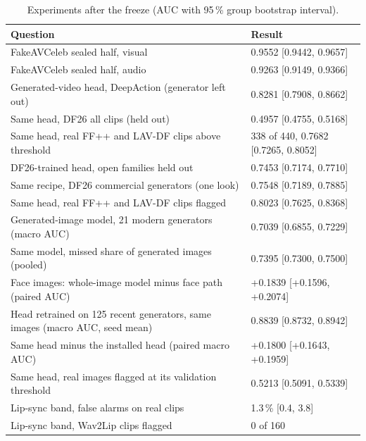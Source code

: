 \documentclass[conference,a4paper]{IEEEtran_nodash}
\begin{document}
\begin{table}[!t]
\caption{Experiments after the freeze (AUC with 95\,\% group bootstrap interval).}
\label{tab:later}
\centering
\footnotesize
\begin{tabular}{@{}p{}p{}@{}}
\toprule
Question & Result \\
\midrule
FakeAVCeleb sealed half, visual & 0.9552 [0.9442, 0.9657] \\
FakeAVCeleb sealed half, audio & 0.9263 [0.9149, 0.9366] \\
Generated-video head, DeepAction (generator left out) & 0.8281 [0.7908, 0.8662] \\
Same head, DF26 all clips (held out) & 0.4957 [0.4755, 0.5168] \\
Same head, real FF++ and LAV-DF clips above threshold & 338 of 440, 0.7682 [0.7265, 0.8052] \\
DF26-trained head, open families held out & 0.7453 [0.7174, 0.7710] \\
Same recipe, DF26 commercial generators (one look) & 0.7548 [0.7189, 0.7885] \\
Same head, real FF++ and LAV-DF clips flagged & 0.8023 [0.7625, 0.8368] \\
Generated-image model, 21 modern generators (macro AUC) & 0.7039 [0.6855, 0.7229] \\
Same model, missed share of generated images (pooled) & 0.7395 [0.7300, 0.7500] \\
Face images: whole-image model minus face path (paired AUC) & +0.1839 [+0.1596, +0.2074] \\
Head retrained on 125 recent generators, same images (macro AUC, seed mean) & 0.8839 [0.8732, 0.8942] \\
Same head minus the installed head (paired macro AUC) & +0.1800 [+0.1643, +0.1959] \\
Same head, real images flagged at its validation threshold & 0.5213 [0.5091, 0.5339] \\
Lip-sync band, false alarms on real clips & 1.3\,\% [0.4, 3.8] \\
Lip-sync band, Wav2Lip clips flagged & 0 of 160 \\
\bottomrule
\end{tabular}
\end{table}
\end{document}
